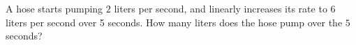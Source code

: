 A hose starts pumping $2$ liters per second, and linearly increases its rate to $6$ liters per second over 5 seconds. How many liters does the hose pump over the $5$ seconds?
